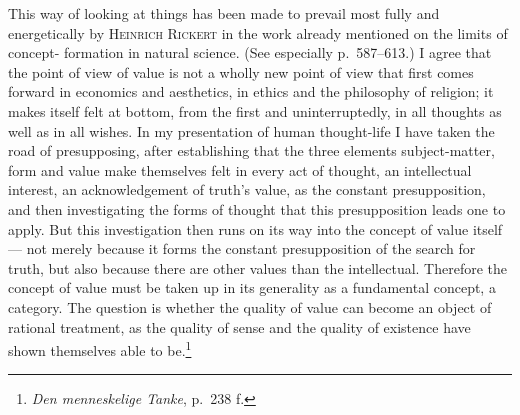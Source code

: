 \documentclass[12pt]{book}
\begin{document}
This way of looking at things has been made to prevail most fully and energetically
by \textsc{Heinrich Rickert} in the work already mentioned on the limits of concept-
formation in natural science. (See especially p.\ 587--613.) I agree that the point
of view of value is not a wholly new point of view that first comes forward in
economics and aesthetics, in ethics and the philosophy of religion; it makes itself
felt at bottom, from the first and uninterruptedly, in all thoughts as well as in
all wishes. In my presentation of human thought-life I have taken the road of
presupposing, after establishing that the three elements subject-matter, form and
value make themselves felt in every act of thought, an intellectual interest, an
acknowledgement of truth's value, as the constant presupposition, and then
investigating the forms of thought that this presupposition leads one to apply. But
this investigation then runs on its way into the concept of value itself --- not
merely because it forms the constant presupposition of the search for truth, but
also because there are other values than the intellectual. Therefore the concept of
value must be taken up in its generality as a fundamental concept, a category. The
question is whether the quality of value can become an object of rational treatment,
as the quality of sense and the quality of existence have shown themselves able to
be.\footnote{\textit{Den menneskelige Tanke}, p.\ 238 f.}
\end{document}
